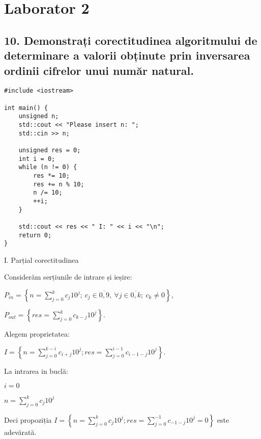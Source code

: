 \documentclass[11pt]{article}
\begin{document}
\pagebreak

\section*{Laborator 2}
\label{sec:org7cceb67}

\subsection*{10. Demonstrați corectitudinea algoritmului de determinare a valorii obținute prin inversarea ordinii cifrelor unui număr natural.}
\label{sec:org7f7ac68}

\begin{verbatim}
#include <iostream>

int main() {
    unsigned n;
    std::cout << "Please insert n: ";
    std::cin >> n;

    unsigned res = 0;
    int i = 0;
    while (n != 0) {
        res *= 10;
        res += n % 10;
        n /= 10;
        ++i;
    }

    std::cout << res << " I: " << i << "\n";
    return 0;
}
\end{verbatim}

\noindent
I. Parțial corectitudinea
\newline

Considerăm serțiunile de intrare și ieșire:

$P_{in} = \left\{ n = \sum\limits_{j=0}^{k} c_{j}10^{j};\ 
                c_{j} \in \overline{0,9} ,\ \forall j \in \overline{0,k};\ 
                c_{k} \neq 0 \right\}$,

$P_{out} = \left\{ \mathit{res} = \sum\limits_{j=0}^{k} c_{k-j}10^{j} \right\}$.

\vspace{14pt}
Alegem proprietatea:

$I = \left\{
              n = \sum\limits_{j=0}^{k-i}c_{i+j}10^{j};
              \mathit{res} = \sum\limits_{j=0}^{i-1}c_{i-1-j}10^{j}
 \right\}$.

\vspace{14pt}
La intrarea in buclă:

$i = 0$

$n = \sum\limits_{j=0}^{k}c_{j}10^{j}$

Deci propoziția
$I = \left\{
              n = \sum\limits_{j=0}^{k}c_{j}10^{j};
              \mathit{res} = \sum\limits_{j=0}^{-1}c_{-1-j}10^{j} = 0
      \right\}$ 
 este adevărată.
\end{document}
